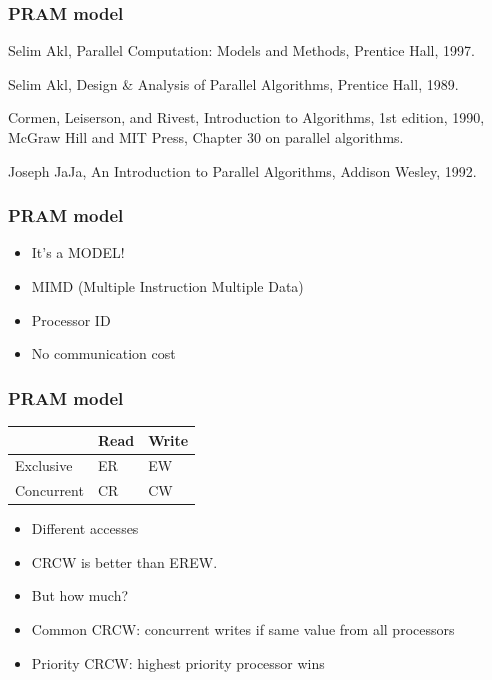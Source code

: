 \documentclass[14pt]{beamer}
\begin{document}
\begin{frame}\frametitle{PRAM model}
\begin{references}
Selim Akl, Parallel Computation: Models and Methods, Prentice Hall, 1997.    
\end{references}

\begin{references}
Selim Akl, Design \& Analysis of Parallel Algorithms, Prentice Hall, 1989.
\end{references}

\begin{references}
Cormen, Leiserson, and Rivest, Introduction to Algorithms, 1st edition,
1990, McGraw Hill and MIT Press, Chapter 30 on parallel algorithms.
\end{references}

\begin{references}
Joseph JaJa, An Introduction to Parallel Algorithms, Addison Wesley, 1992.
\end{references}
\end{frame}

\begin{frame}\frametitle{PRAM model}
  \begin{itemize}
  \item
    It's a \alert{MODEL}!
  \item
    MIMD (Multiple Instruction Multiple Data)
  \item
    Processor ID
  \item
    No communication cost
  \end{itemize}
\end{frame}

\begin{frame}\frametitle{PRAM model}
\begin{center}
  \begin{tabular}{|l|l|l|}
\hline
 & Read & Write \\
\hline
Exclusive & ER & EW \\
\hline
Concurrent & CR & CW \\
\hline
\end{tabular}

\begin{itemize}
\item
  Different accesses
  \item
    CRCW is better than EREW.
  \item
    But how much?
  \item
    Common CRCW: concurrent writes if same value from all processors
  \item
    Priority CRCW: highest priority processor wins
  \end{itemize}
\end{center}
\end{frame}
\end{document}
